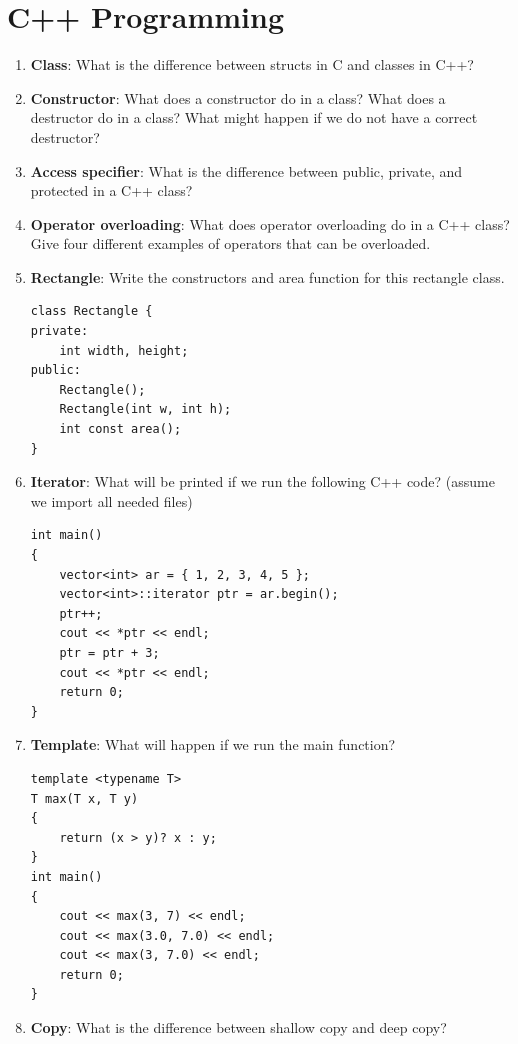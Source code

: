 \documentclass{article}
\begin{document}
\section{C++ Programming}

\begin{enumerate}[label=(\alph*), itemsep = 120pt]
    \item \textbf{Class}: What is the difference between structs in C and classes in C++?
    
    \item \textbf{Constructor}: What does a constructor do in a class? What does a destructor do in a class? What might happen if we do not have a correct destructor?
    
    \item \textbf{Access specifier}: What is the difference between public, private, and protected in a C++ class?
    
    \item \textbf{Operator overloading}: What does operator overloading do in a C++ class? Give four different examples of operators that can be overloaded.
    
    \item \textbf{Rectangle}: Write the constructors and area function for this rectangle class.
    \begin{lstlisting}[style=CStyle]
class Rectangle {
private:
    int width, height;
public:
    Rectangle();
    Rectangle(int w, int h);
    int const area();
}
\end{lstlisting}
    \item \textbf{Iterator}: What will be printed if we run the following C++ code? (assume we import all needed files)
    \begin{lstlisting}[style=CStyle]
    int main() 
{ 
    vector<int> ar = { 1, 2, 3, 4, 5 }; 
    vector<int>::iterator ptr = ar.begin(); 
    ptr++;
    cout << *ptr << endl; 
    ptr = ptr + 3;
    cout << *ptr << endl; 
    return 0; 
}
\end{lstlisting}
    \item \textbf{Template}: What will happen if we run the main function?
    \begin{lstlisting}[style=CStyle]
template <typename T>
T max(T x, T y)
{
    return (x > y)? x : y;
}
int main()
{
    cout << max(3, 7) << endl;
    cout << max(3.0, 7.0) << endl;
    cout << max(3, 7.0) << endl;
    return 0;
}
\end{lstlisting}
    \item \textbf{Copy}: What is the difference between shallow copy and deep copy?



\end{enumerate}
\end{document}
